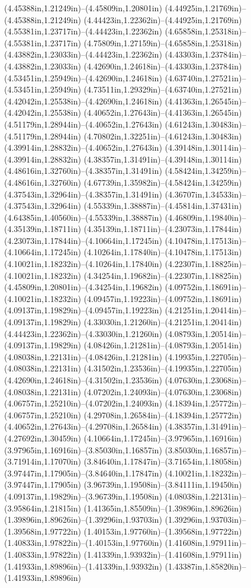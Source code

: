 (4.45388in,1.21249in)--(4.45809in,1.20801in) (4.44925in,1.21769in)--(4.45388in,1.21249in) (4.44423in,1.22362in)--(4.44925in,1.21769in) (4.55381in,1.23717in)--(4.44423in,1.22362in) (4.65858in,1.25318in)--(4.55381in,1.23717in) (4.75809in,1.27159in)--(4.65858in,1.25318in) (4.43882in,1.23033in)--(4.44423in,1.22362in) (4.43303in,1.23784in)--(4.43882in,1.23033in) (4.42690in,1.24618in)--(4.43303in,1.23784in) (4.53451in,1.25949in)--(4.42690in,1.24618in) (4.63740in,1.27521in)--(4.53451in,1.25949in) (4.73511in,1.29329in)--(4.63740in,1.27521in) (4.42042in,1.25538in)--(4.42690in,1.24618in) (4.41363in,1.26545in)--(4.42042in,1.25538in) (4.40652in,1.27643in)--(4.41363in,1.26545in) (4.51179in,1.28944in)--(4.40652in,1.27643in) (4.61243in,1.30483in)--(4.51179in,1.28944in) (4.70802in,1.32251in)--(4.61243in,1.30483in) (4.39914in,1.28832in)--(4.40652in,1.27643in) (4.39148in,1.30114in)--(4.39914in,1.28832in) (4.38357in,1.31491in)--(4.39148in,1.30114in) (4.48616in,1.32760in)--(4.38357in,1.31491in) (4.58424in,1.34259in)--(4.48616in,1.32760in) (4.67739in,1.35982in)--(4.58424in,1.34259in) (4.37543in,1.32964in)--(4.38357in,1.31491in) (4.36707in,1.34533in)--(4.37543in,1.32964in) (4.55339in,1.38887in)--(4.45814in,1.37431in) (4.64385in,1.40560in)--(4.55339in,1.38887in) (4.46809in,1.19840in)--(4.35139in,1.18711in) (4.35139in,1.18711in)--(4.23073in,1.17844in) (4.23073in,1.17844in)--(4.10664in,1.17245in) (4.10478in,1.17513in)--(4.10664in,1.17245in) (4.10264in,1.17840in)--(4.10478in,1.17513in) (4.10021in,1.18232in)--(4.10264in,1.17840in) (4.22307in,1.18825in)--(4.10021in,1.18232in) (4.34254in,1.19682in)--(4.22307in,1.18825in) (4.45809in,1.20801in)--(4.34254in,1.19682in) (4.09752in,1.18691in)--(4.10021in,1.18232in) (4.09457in,1.19223in)--(4.09752in,1.18691in) (4.09137in,1.19829in)--(4.09457in,1.19223in) (4.21251in,1.20414in)--(4.09137in,1.19829in) (4.33030in,1.21260in)--(4.21251in,1.20414in) (4.44423in,1.22362in)--(4.33030in,1.21260in) (4.08793in,1.20514in)--(4.09137in,1.19829in) (4.08426in,1.21281in)--(4.08793in,1.20514in) (4.08038in,1.22131in)--(4.08426in,1.21281in) (4.19935in,1.22705in)--(4.08038in,1.22131in) (4.31502in,1.23536in)--(4.19935in,1.22705in) (4.42690in,1.24618in)--(4.31502in,1.23536in) (4.07630in,1.23068in)--(4.08038in,1.22131in) (4.07202in,1.24093in)--(4.07630in,1.23068in) (4.06757in,1.25210in)--(4.07202in,1.24093in) (4.18394in,1.25772in)--(4.06757in,1.25210in) (4.29708in,1.26584in)--(4.18394in,1.25772in) (4.40652in,1.27643in)--(4.29708in,1.26584in) (4.38357in,1.31491in)--(4.27692in,1.30459in) (4.10664in,1.17245in)--(3.97965in,1.16916in) (3.97965in,1.16916in)--(3.85030in,1.16857in) (3.85030in,1.16857in)--(3.71914in,1.17070in) (3.84640in,1.17847in)--(3.71654in,1.18058in) (3.97447in,1.17905in)--(3.84640in,1.17847in) (4.10021in,1.18232in)--(3.97447in,1.17905in) (3.96739in,1.19508in)--(3.84111in,1.19450in) (4.09137in,1.19829in)--(3.96739in,1.19508in) (4.08038in,1.22131in)--(3.95864in,1.21815in) (1.41365in,1.85509in)--(1.39896in,1.89626in) (1.39896in,1.89626in)--(1.39296in,1.93703in) (1.39296in,1.93703in)--(1.39568in,1.97722in) (1.40153in,1.97760in)--(1.39568in,1.97722in) (1.40833in,1.97822in)--(1.40153in,1.97760in) (1.41608in,1.97911in)--(1.40833in,1.97822in) (1.41339in,1.93932in)--(1.41608in,1.97911in) (1.41933in,1.89896in)--(1.41339in,1.93932in) (1.43387in,1.85820in)--(1.41933in,1.89896in) 